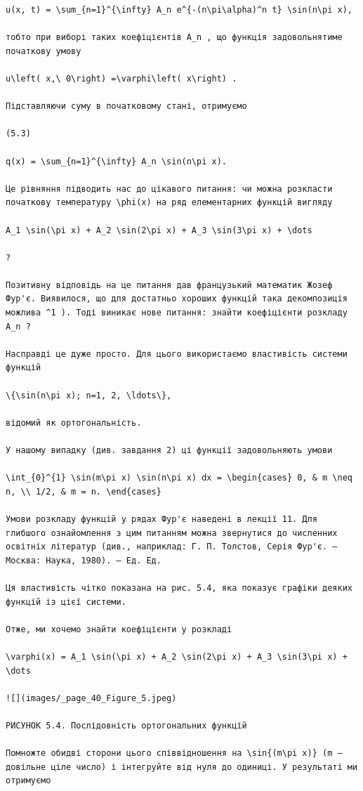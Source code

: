 \documentclass[
  ukrainian,
]{article}
\begin{document}
\begin{verbatim}
u(x, t) = \sum_{n=1}^{\infty} A_n e^{-(n\pi\alpha)^n t} \sin(n\pi x),

тобто при виборі таких коефіцієнтів A_n , що функція задовольнятиме початкову умову

u\left( x,\ 0\right) =\varphi\left( x\right) .

Підставляючи суму в початковому стані, отримуємо

(5.3)

q(x) = \sum_{n=1}^{\infty} A_n \sin(n\pi x).

Це рівняння підводить нас до цікавого питання: чи можна розкласти початкову температуру \phi(x) на ряд елементарних функцій вигляду

A_1 \sin(\pi x) + A_2 \sin(2\pi x) + A_3 \sin(3\pi x) + \dots

?

Позитивну відповідь на це питання дав французький математик Жозеф Фур'є. Виявилося, що для достатньо хороших функцій така декомпозиція можлива ^1 ). Тоді виникає нове питання: знайти коефіцієнти розкладу A_n ?

Насправді це дуже просто. Для цього використаємо властивість системи функцій

\{\sin(n\pi x); n=1, 2, \ldots\},

відомий як ортогональність.

У нашому випадку (див. завдання 2) ці функції задовольняють умови

\int_{0}^{1} \sin(m\pi x) \sin(n\pi x) dx = \begin{cases} 0, & m \neq n, \\ 1/2, & m = n. \end{cases}

Умови розкладу функцій у рядах Фур'є наведені в лекції 11. Для глибшого ознайомлення з цим питанням можна звернутися до численних освітніх літератур (див., наприклад: Г. П. Толстов, Серія Фур'є. — Москва: Наука, 1980). — Ед. Ед.

Ця властивість чітко показана на рис. 5.4, яка показує графіки деяких функцій із цієї системи.

Отже, ми хочемо знайти коефіцієнти у розкладі

\varphi(x) = A_1 \sin(\pi x) + A_2 \sin(2\pi x) + A_3 \sin(3\pi x) + \dots

![](images/_page_40_Figure_5.jpeg)

РИСУНОК 5.4. Послідовність ортогональних функцій

Помножте обидві сторони цього співвідношення на \sin{(m\pi x)} (m — довільне ціле число) і інтегруйте від нуля до одиниці. У результаті ми отримуємо


\end{verbatim}
\end{document}
